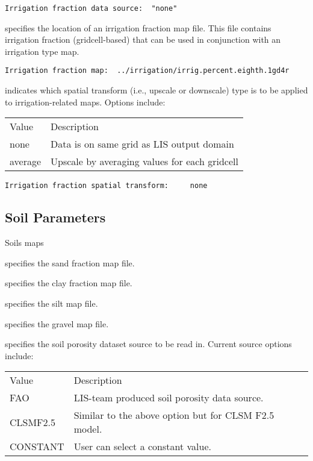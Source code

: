  \begin{Verbatim}[frame=single]
Irrigation fraction data source:  "none"
 \end{Verbatim}

 
  specifies the location of an
 irrigation fraction map file.
 This file contains irrigation fraction (gridcell-based) that
 can be used in conjunction with an irrigation type map.
 

 \begin{Verbatim}[frame=single]
Irrigation fraction map:  ../irrigation/irrig.percent.eighth.1gd4r
 \end{Verbatim}

 
  indicates which spatial transform
 (i.e., upscale or downscale) type is to be applied to
 irrigation-related maps.  Options include:

 \begin{tabular}{ll}
 Value   & Description                                   \\
 none    & Data is on same grid as LIS output domain     \\
 average & Upscale by averaging values for each gridcell \\
 \end{tabular}
 

 \begin{Verbatim}[frame=single]
Irrigation fraction spatial transform:     none
 \end{Verbatim}


 
 \subsection{Soil Parameters} \label{ssec:soilspecparams}
 

 
 Soils maps

  specifies the sand fraction map file.

  specifies the clay fraction map file.

  specifies the silt map file.

 
  specifies the gravel map file.
 

  specifies the soil porosity
 dataset source to be read in. Current source options include:

 \begin{tabular}{ll}
 Value      & Description    \\
 FAO          &  LIS-team produced soil porosity data source. \\
 CLSMF2.5     &  Similar to the above option but for CLSM F2.5 model. \\
 CONSTANT     &  User can select a constant value. \\
 \end{tabular}

